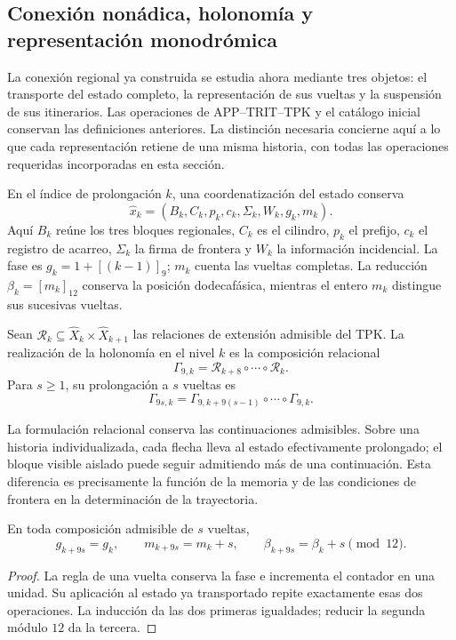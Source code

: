 \subsection{Conexión nonádica, holonomía y representación monodrómica}
\label{mono-ampl:conexion}

La conexión regional ya construida se estudia ahora mediante tres objetos:
el transporte del estado completo, la representación de sus vueltas y la
suspensión de sus itinerarios. Las operaciones de APP--TRIT--TPK y el
catálogo inicial conservan las definiciones anteriores. La distinción
necesaria concierne aquí a lo que cada representación retiene de una
misma historia, con todas las operaciones requeridas incorporadas en esta
sección.

En el índice de prolongación \(k\), una coordenatización del estado conserva
\[
 \widehat x_k=(B_k,C_k,p_k,c_k,\Sigma_k,W_k,g_k,m_k).
\]
Aquí \(B_k\) reúne los tres bloques regionales, \(C_k\) es el cilindro,
\(p_k\) el prefijo, \(c_k\) el registro de acarreo, \(\Sigma_k\) la firma
de frontera y \(W_k\) la información incidencial. La fase es
\(g_k=1+[(k-1)]_9\); \(m_k\) cuenta las vueltas completas. La reducción
\(\beta_k=[m_k]_{12}\) conserva la posición dodecafásica, mientras el
entero \(m_k\) distingue sus sucesivas vueltas.

\begin{definition}
\label{mono-ampl:def-vuelta}
Sean \(\mathcal R_k\subseteq\widehat X_k\times\widehat X_{k+1}\)
las relaciones de extensión admisible del TPK. La realización de la
holonomía en el nivel \(k\) es la composición relacional
\[
 \Gamma_{9,k}=\mathcal R_{k+8}\circ\cdots\circ\mathcal R_k.
\]
Para \(s\geq1\), su prolongación a \(s\) vueltas es
\[
 \Gamma_{9s,k}=
 \Gamma_{9,k+9(s-1)}\circ\cdots\circ\Gamma_{9,k}.
\]
\end{definition}

La formulación relacional conserva las continuaciones admisibles. Sobre
una historia individualizada, cada flecha lleva al estado efectivamente
prolongado; el bloque visible aislado puede seguir admitiendo más de una
continuación. Esta diferencia es precisamente la función de la memoria y
de las condiciones de frontera en la determinación de la trayectoria.

\begin{proposition}
\label{mono-ampl:vueltas}
En toda composición admisible de \(s\) vueltas,
\[
 g_{k+9s}=g_k,\qquad m_{k+9s}=m_k+s,\qquad
 \beta_{k+9s}=\beta_k+s\pmod{12}.
\]
\end{proposition}
\begin{proof}
La regla de una vuelta conserva la fase e incrementa el contador en una
unidad. Su aplicación al estado ya transportado repite exactamente esas
dos operaciones. La inducción da las dos primeras igualdades; reducir la
segunda módulo \(12\) da la tercera.
\end{proof}

